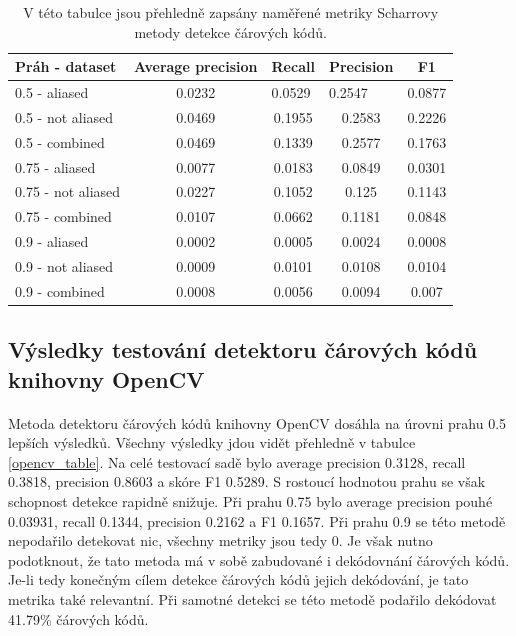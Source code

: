 \begin{table}[ht]
\centering
\begin{tabular}{|l|c|c|c|c|}
\hline
Práh - dataset     & Average precision & Recall  & Precision & F1      \\ \hline
0.5 - aliased & 0.0232 & \multicolumn{1}{l|}{0.0529} & \multicolumn{1}{l|}{0.2547 } & \multicolumn{1}{l|}{0.0877} \\ \hline
0.5 - not aliased  & 0.0469           & 0.1955 & 0.2583   & 0.2226 \\ \hline
0.5 - combined     & 0.0469           & 0.1339 & 0.2577    & 0.1763\\ \hline
0.75 - aliased     & 0.0077             & 0.0183  & 0.0849    & 0.0301  \\ \hline
0.75 - not aliased &  0.0227            & 0.1052 & 0.125   & 0.1143 \\ \hline
0.75 - combined    & 0.0107            & 0.0662 & 0.1181   & 0.0848  \\ \hline
0.9 - aliased      & 0.0002               & 0.0005     & 0.0024       & 0.0008     \\ \hline
0.9 - not aliased  & 0.0009               & 0.0101     & 0.0108       & 0.0104     \\ \hline
0.9 - combined     & 0.0008               & 0.0056     & 0.0094       & 0.007     \\ \hline
\end{tabular}
\caption{V této tabulce jsou přehledně zapsány naměřené metriky Scharrovy metody detekce čárových kódů.}
\label{scharr_table}
\end{table}


\subsection*{Výsledky testování detektoru čárových kódů knihovny OpenCV}
\label{opencv_exp}
\paragraph{} Metoda detektoru čárových kódů knihovny OpenCV dosáhla na úrovni prahu 0.5 lepších výsledků. Všechny výsledky jdou vidět přehledně v tabulce \ref{opencv_table}. Na celé testovací sadě bylo average precision 0.3128, recall 0.3818, precision 0.8603 a skóre F1 0.5289. S rostoucí hodnotou prahu se však schopnost detekce rapidně snižuje. Při prahu 0.75 bylo average precision pouhé 0.03931, recall 0.1344, precision 0.2162 a F1 0.1657. Při prahu 0.9 se této metodě nepodařilo detekovat nic, všechny metriky jsou tedy 0. Je však nutno podotknout, že tato metoda má v sobě zabudované i dekódovnání čárových kódů. Je-li tedy konečným cílem detekce čárových kódů jejich dekódování, je tato metrika také relevantní. Při samotné detekci se této metodě podařilo dekódovat 41.79\% čárových kódů.
